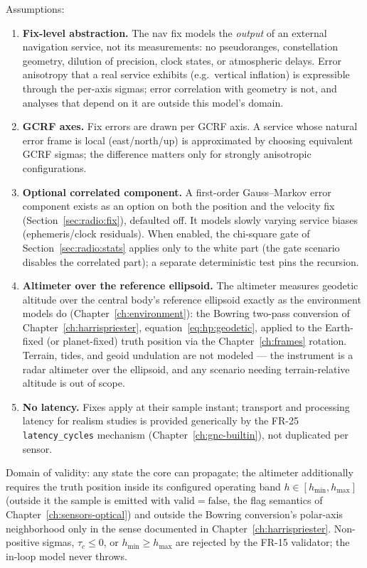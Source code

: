 Assumptions:
\begin{enumerate}
  \item \textbf{Fix-level abstraction.} The nav fix models the
    \emph{output} of an external navigation service, not its
    measurements: no pseudoranges, constellation geometry, dilution of
    precision, clock states, or atmospheric delays. Error anisotropy
    that a real service exhibits (e.g.\ vertical inflation) is
    expressible through the per-axis sigmas; error correlation with
    geometry is not, and analyses that depend on it are outside this
    model's domain.
  \item \textbf{GCRF axes.} Fix errors are drawn per GCRF axis. A
    service whose natural error frame is local (east/north/up) is
    approximated by choosing equivalent GCRF sigmas; the difference
    matters only for strongly anisotropic configurations.
  \item \textbf{Optional correlated component.} A first-order
    Gauss--Markov error component exists as an option on both the
    position and the velocity fix (Section~\ref{sec:radio:fix}),
    defaulted off. It models slowly varying service biases
    (ephemeris/clock residuals). When enabled, the chi-square gate of
    Section~\ref{sec:radio:stats} applies only to the white part
    (the gate scenario disables the correlated part); a separate
    deterministic test pins the recursion.
  \item \textbf{Altimeter over the reference ellipsoid.} The altimeter
    measures geodetic altitude over the central body's reference
    ellipsoid exactly as the environment models do
    (Chapter~\ref{ch:environment}): the Bowring two-pass conversion of
    Chapter~\ref{ch:harrispriester},
    equation~\eqref{eq:hp:geodetic}, applied to the Earth-fixed (or
    planet-fixed) truth position via the Chapter~\ref{ch:frames}
    rotation. Terrain, tides, and geoid undulation are not modeled ---
    the instrument is a radar altimeter over the ellipsoid, and any
    scenario needing terrain-relative altitude is out of scope.
  \item \textbf{No latency.} Fixes apply at their sample instant;
    transport and processing latency for realism studies is provided
    generically by the FR-25 \texttt{latency\_cycles} mechanism
    (Chapter~\ref{ch:gnc-builtin}), not duplicated per sensor.
\end{enumerate}

Domain of validity: any state the core can propagate; the altimeter
additionally requires the truth position inside its configured operating
band $h \in [h_{\min}, h_{\max}]$ (outside it the sample is emitted with
$\mathrm{valid} = \mathrm{false}$, the flag semantics of
Chapter~\ref{ch:sensors-optical}) and outside the Bowring conversion's
polar-axis neighborhood only in the sense documented in
Chapter~\ref{ch:harrispriester}. Non-positive sigmas, $\tau_c \le 0$, or
$h_{\min} \ge h_{\max}$ are rejected by the FR-15 validator; the in-loop
model never throws.

